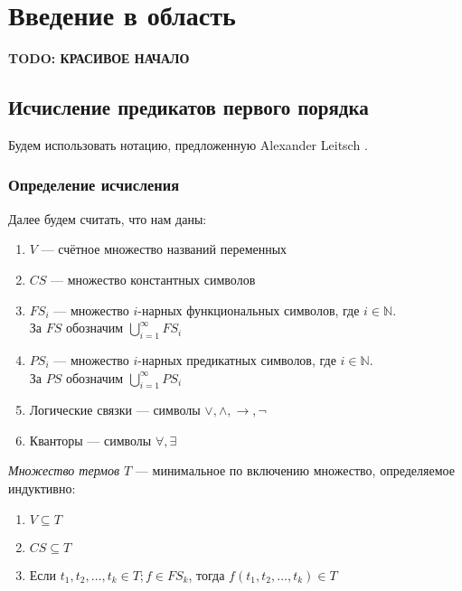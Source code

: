 \chapter{Введение в область}
\startrelatedwork

\textbf{TODO: КРАСИВОЕ НАЧАЛО}

\section{Исчисление предикатов первого порядка}

Будем использовать нотацию, предложенную Alexander Leitsch \cite{Leitsch:1997:RC:260906}.

\subsection{Определение исчисления}

Далее будем считать, что нам даны:
\begin{enumerate}
	\item $V$    --- счётное множество названий переменных
    \item $CS$   --- множество константных символов
    \item $FS_i$ --- множество $i$-нарных функциональных символов, где $i \in \mathbb{N}$. \\
    За $FS$ обозначим $\bigcup\limits_{i=1}^{\infty} FS_{i}$
    \item $PS_i$ --- множество $i$-нарных предикатных символов, где $i \in \mathbb{N}$. \\
    За $PS$ обозначим $\bigcup\limits_{i=1}^{\infty} PS_{i}$
    \item Логические связки --- символы $\vee, \wedge, \rightarrow, \neg$
    \item Кванторы --- символы $\forall, \exists$
\end{enumerate}

\begin{definition}
  \emph{Множество термов $T$} --- минимальное по включению множество, определяемое индуктивно:
  \begin{enumerate}
  	\item $V \subseteq T$
    \item $CS \subseteq T$
    \item Если $t_1, t_2, \ldots, t_k \in T; f \in FS_k$, тогда $f(t_1, t_2, \ldots, t_k) \in T$
  \end{enumerate}
\end{definition}

